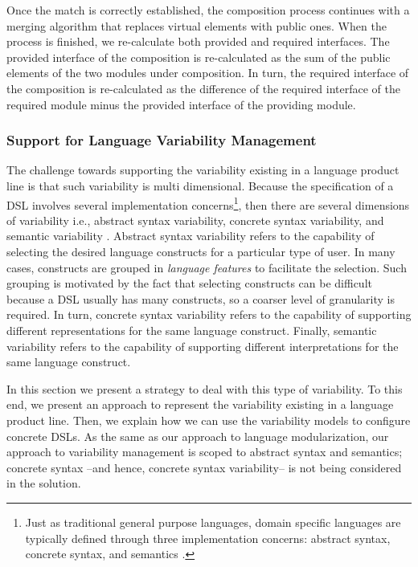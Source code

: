 Once the match is correctly established, the composition process continues with a merging algorithm that replaces virtual elements with public ones. When the process is finished, we re-calculate both provided and required interfaces. The provided interface of the composition is re-calculated as the sum of the public elements of the two modules under composition. In turn, the required interface of the composition is re-calculated as the difference of the required interface of the required module minus the provided interface of the providing module. 

\subsubsection{Support for Language Variability Management}

The challenge towards supporting the variability existing in a language product line is that such variability is multi dimensional. Because the specification of a DSL involves several implementation concerns\footnote{Just as traditional general purpose languages, domain specific languages are typically defined through three implementation concerns: abstract syntax, concrete syntax, and semantics \cite{Harel:2004b}.}, then there are several dimensions of variability i.e., abstract syntax variability, concrete syntax variability, and semantic variability \cite{Cengarle:2009,Gronniger:2011}. Abstract syntax variability refers to the capability of selecting the desired language constructs for a particular type of user. In many cases, constructs are grouped in \textit{language features} to facilitate the selection. Such grouping is motivated by the fact that selecting constructs can be difficult because a DSL usually has many constructs, so a coarser level of granularity is required. In turn, concrete syntax variability refers to the capability of supporting different representations for the same language construct. Finally, semantic variability refers to the capability of supporting different interpretations for the same language construct.

In this section we present a strategy to deal with this type of variability. To this end, we present an approach to represent the variability existing in a language product line. Then, we explain how we can use the variability models to configure concrete DSLs. As the same as our approach to language modularization, our approach to variability management is scoped to abstract syntax and semantics; concrete syntax --and hence, concrete syntax variability-- is not being considered in the solution. 

